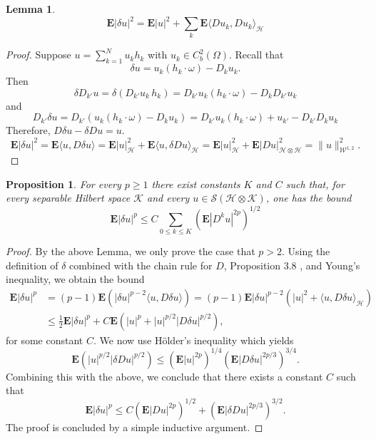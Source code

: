 \documentclass[twoside, 12pt]{book}
\numberwithin{equation}{chapter}
\newtheorem{lemma}[theorem]{Lemma}
\newtheorem{proposition}[theorem]{Proposition}
\def\cH{{\mathcal H}}
\def\cK{{\mathcal K}}
\def\bE{{\mathbf E}}
\def\sS{{\mathscr S}}
\def\sW{{\mathscr W}}
\def\l{\left}
\def\r{\right}
\def\<{\langle}
\def\>{\rangle}
\def\geq{\geqslant}
\def\leq{\leqslant}
\begin{document}
   \begin{lemma}
   	   \[
   	      \bE|\delta u|^2 = \bE |u|^2+ \sum_{k} \bE \<D u_k, Du_k\>_{\cH}
   	   \]
   \end{lemma}
   \begin{proof}
   	   Suppose $u= \sum_{k=1}^N u_k h_k$ with $u_k\in C^2_b(\Omega)$. Recall that 
   	   \[
   	       \delta u=  u_k (h_k\cdot \omega)- D_k u_k. 
   	   \]
   	   Then 
   	   \[
   	       \delta D_{k'}u = \delta( D_{k'} u_k\, h_k ) =D_{k'} u_k ( h_k\cdot \omega)-D_{k}D_{k'}u_k
   	   \]
   	  and 
   	  \begin{equation*}
   	    	D_{k'}\delta u = D_{k'} \l( u_k (h_k\cdot \omega)- D_k u_k \r)=D_{k'} u_k (h_k\cdot \omega)+u_{k'}-D_{k'}D_k u_k
   	    \end{equation*}
   	    Therefore, $D\delta u-\delta D u=u$. 
   	    \[
   	        \bE |\delta u|^2 = \bE \<u, D \delta u\>= \bE |u|^2_{\cH}+ \bE \<u, \delta D u\>_{\cH} = \bE |u|^2_{\cH}+ \bE |D u|_{\cH\otimes\cH}^2= \|u\|_{\sW^{1,2}}^2.  
   	    \]
   	    
   \end{proof}
   
   \begin{proposition}
   	For every $p\geq 1$ there exist constants $K$ and $C$ such that, for every
   	separable Hilbert space $\cK$ and every $u\in \sS(\cH \otimes \cK)$, one has the bound
   	\[
   	    \bE |\delta u|^p\leq C \sum_{0\leq k\leq K} \l( \bE |D^k u|^{2p} \r)^{1/2}
   	\]
   \end{proposition}
   \begin{proof}
   	
   	By the above Lemma, we only prove the case that $p>2$. Using the definition of $\delta$ combined with the chain rule for $D$, Proposition 3.8 , and Young's inequality, we obtain the bound
   	$$
   	\begin{aligned}
   		\mathbf{E}|\delta u|^p & =(p-1) \mathbf{E}\left(|\delta u|^{p-2}\langle u, D \delta u\rangle\right)=(p-1) \mathbf{E}|\delta u|^{p-2}\left(|u|^2+\langle u, D\delta u\rangle_\cH\right) \\
   		& \leq \frac{1}{2} \mathbf{E}|\delta u|^p+C \mathbf{E}\left(|u|^p+|u|^{p / 2}|D \delta  u|^{p / 2}\right),
   	\end{aligned}
   	$$
   	for some constant $C$. We now use Hölder's inequality which yields
   	$$
   	\mathbf{E}\left(|u|^{p / 2}|\delta D u|^{p / 2}\right) \leq\left(\mathbf{E}|u|^{2 p}\right)^{1 / 4}\left(\mathbf{E}|D \delta u|^{2 p / 3}\right)^{3 / 4} .
   	$$
   	Combining this with the above, we conclude that there exists a constant $C$ such that
   	$$
   	\mathbf{E}|\delta u|^p \leq C\left(\mathbf{E}\left|D u\right|^{2 p}\right)^{1 / 2}+\left(\mathbf{E}|\delta D u|^{2 p / 3}\right)^{3 / 2} .
   	$$
   	The proof is concluded by a simple inductive argument.
   \end{proof}
  
\end{document}
